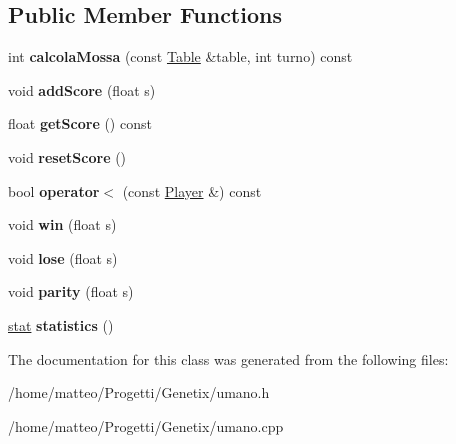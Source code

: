 \subsection*{Public Member Functions}
\begin{DoxyCompactItemize}
\item 
\mbox{\label{classUmano_aae2b7d9ba681fcda479ae0c7a058f9cf}} 
int {\bfseries calcola\+Mossa} (const \hyperlink{classTable}{Table} \&table, int turno) const
\item 
\mbox{\label{classUmano_a09c8effb9149f8415c594add2a0916d8}} 
void {\bfseries add\+Score} (float s)
\item 
\mbox{\label{classUmano_a1e3f2122b2d85c4c094500df599be6cc}} 
float {\bfseries get\+Score} () const
\item 
\mbox{\label{classUmano_a5c8477b656066e4b9665e6bb4c61baa4}} 
void {\bfseries reset\+Score} ()
\item 
\mbox{\label{classUmano_aeab5410ca7202aef8aae1385d6dd4348}} 
bool {\bfseries operator$<$} (const \hyperlink{classPlayer}{Player} \&) const
\item 
\mbox{\label{classUmano_aa1d6cfc4bcbf0db3e2f44a6c4141a02b}} 
void {\bfseries win} (float s)
\item 
\mbox{\label{classUmano_af4f030bea9879a7bc3bbaf1f8ff37f99}} 
void {\bfseries lose} (float s)
\item 
\mbox{\label{classUmano_a18d02c3473b5cfeac64d1dedfb6eb08f}} 
void {\bfseries parity} (float s)
\item 
\mbox{\label{classUmano_a021c553059535dfd141388d689dc4a9c}} 
\hyperlink{structstat}{stat} {\bfseries statistics} ()
\end{DoxyCompactItemize}


The documentation for this class was generated from the following files\+:\begin{DoxyCompactItemize}
\item 
/home/matteo/\+Progetti/\+Genetix/umano.\+h\item 
/home/matteo/\+Progetti/\+Genetix/umano.\+cpp\end{DoxyCompactItemize}
